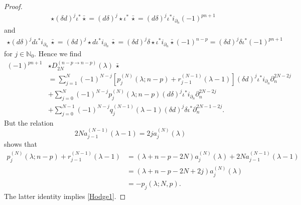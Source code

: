 \documentclass[a4paper,12pt,reqno]{amsart}
\numberwithin{theorem}{subsection}
\numberwithin{equation}{section}
\begin{document}
\begin{proof}
\begin{align*}
   & \star (\delta {d})^j \iota^* \bar{\star} = ({d} \delta)^j \star \iota^* \, \bar{\star}
   = ({d} \delta)^j \iota^* i_{\partial_n}(-1)^{pn+1}
\end{align*}
and
\begin{align*}
   \star ({d} \delta)^j {d} \iota^* i_{\partial_n} \, \bar{\star} = (\delta {d} )^j \star {d} \iota^* i_{\partial_n}
   \, \bar{\star} = (\delta {d})^j \delta \star \iota^* i_{\partial_n} \bar{\star} (-1)^{n-p} =
   (\delta {d})^j \delta \iota^* (-1)^{pn+1}
\end{align*}
for $j \in {\mathbb{N}}_0$. Hence we find
\begin{align*}
   (-1)^{pn+1} & \star D^{(n-p\to n-p)}_{2N}(\lambda) \, \bar{\star} \\
   & = \sum_{j=1}^N(-1)^{N-j} \left[p_j^{(N)}(\lambda;n\!-\!p) + r_{j-1}^{(N-1)}(\lambda\!-\!1)\right]
   (\delta{d})^j \iota^* i_{\partial_n} \partial_n^{2N-2j}\\
   & + \sum_{j=0}^N(-1)^{N-j}p_j^{(N)}(\lambda;n\!-\!p)({d}\delta)^j \iota^*i_{\partial_n}\partial_n^{2N-2j}\\
   & + \sum_{j=0}^{N-1}(-1)^{N-j}q_j^{(N-1)}(\lambda\!-\!1) (\delta{d})^j \delta  \iota^* \partial_n^{2N-1-2j}.
\end{align*}
But the relation
$$
   2N a_{j-1}^{(N-1)}(\lambda\!-\!1) = 2j a_j^{(N)}(\lambda)
$$
shows that
\begin{align*}
   p_j^{(N)}(\lambda;n\!-\!p) + r_{j-1}^{(N-1)}(\lambda\!-\!1) & = (\lambda\!+\!n\!-\!p\!-\!2N) a_j^{(N)}(\lambda)
   + 2N a_{j-1}^{(N-1)}(\lambda\!-\!1)\\
   & = (\lambda\!+\!n\!-\!p\!-\!2N\!+\!2j) a_j^{(N)}(\lambda) \\
   & = - p_j(\lambda;N,p).
\end{align*}
The latter identity implies \eqref{Hodge1}.


\end{proof}
\end{document}
